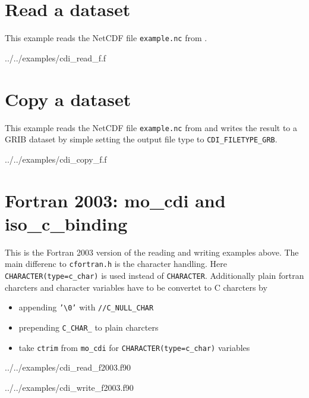 \section{\label{example_read}Read a dataset}

This example reads the NetCDF file \texttt{example.nc} from .


{../../examples/cdi_read_f.f}


\section{Copy a dataset}

This example reads the NetCDF file \texttt{example.nc} from 
and writes the result to a GRIB dataset by simple setting the output file type
to \texttt{CDI\_FILETYPE\_GRB}.


{../../examples/cdi_copy_f.f}

\section{\label{examples_f2003}Fortran 2003: mo\_cdi and iso\_c\_binding}

This is the Fortran 2003 version of the reading and writing examples above.
The main differenc to \texttt{cfortran.h} is the
character handling. Here \texttt{CHARACTER(type=c\_char)} is used instead of
\texttt{CHARACTER}. Additionally plain fortran charcters and character variables
have to be convertet to C charcters by
\begin{itemize}
\item appending \texttt{'\textbackslash 0'} with \texttt{//C\_NULL\_CHAR} 
\item prepending \texttt{C\_CHAR\_} to plain charcters
\item take \texttt{ctrim} from \texttt{mo\_cdi} for \texttt{CHARACTER(type=c\_char)} variables
\end{itemize}


{../../examples/cdi_read_f2003.f90}


{../../examples/cdi_write_f2003.f90}
